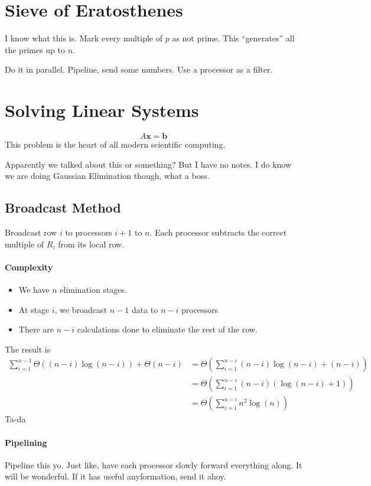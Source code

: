 \documentclass[12pt]{article}
\numberwithin{equation}{section}
\newcommand{\vect}[1] {\mathbf{#1}} %
\theoremstyle{theorem}
\theoremstyle{definition}
\theoremstyle{remark}
\begin{document}
\date{April 28, 2015}
\section{Sieve of Eratosthenes}
I know what this is.  Mark every multiple of $p$ as not prime.  This ``generates'' all the primes up to $n$. 

Do it in parallel.  Pipeline, send some numbers. Use a processor as a filter.

\section{Solving Linear Systems}
\begin{equation}
A\vect{x} = \vect{b}
\end{equation}
This problem is the heart of all modern scientific computing. 

Apparently we talked about this or something?  But I have no notes.  I do know we are doing Gaussian Elimination though, what a boss. 

\subsection{Broadcast Method}
Broadcast row $i$ to processors $i + 1$ to $n$.  Each processor subtracts the correct multiple of $R_i$ from its local row.  
\paragraph{Complexity} 
\begin{itemize}
\item We have $n$ elimination stages.  \\
\item At stage $i$, we broadcast $n - 1$ data to $n - i$ processors
\item There are $n - i$ calculations done to eliminate the rest of the row.
\end{itemize}
The result is 
\begin{align}
\sum_{i=1}^{n-1} \Theta((n - i)\log(n - i)) + \Theta(n - i) &= \Theta(\sum_{i=1}^{n-i} (n-i)\log(n-i) + (n-i)) \\
	&= \Theta(\sum_{i=1}^{n-i} (n - i)(\log(n - i) + 1)) \\
	&= \Theta(\sum_{i=1}^{n-i} n^2\log(n))
\end{align}
Ta-da

\paragraph{Pipelining}
Pipeline this yo.  Just like, have each processor slowly forward everything along.  It will be wonderful.  If it has useful anyformation, send it ahoy. 
\end{document}
